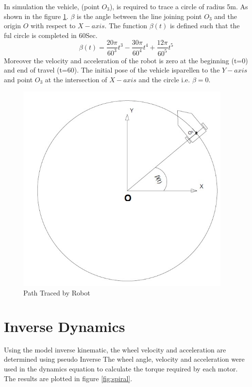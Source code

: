 In  simulation the vehicle, (point $O_3$), is required to trace a circle of radius 5m. As shown in the figure \ref{fig:CirTrace}. $ \beta$ is the angle between the line joining  point $O_3$ and the origin $O$ with respect to $X-axis$. The function $\beta(t)$ is defined such that the ful circle is completed in 60Sec. 
\begin{equation}
\label{path}
\beta(t)=\frac{20\pi}{60^3}t^3-\frac{30\pi}{60^4}t^4+\frac{12\pi}{60^5}t^5
\end{equation}
Moreover the velocity and acceleration of the robot is zero at the beginning (t=0) and end of travel (t=60). The initial pose of the vehicle isparellen to the $Y-axis$ and point $O_3$ at the intersection of $X-axis$ and the circle i.e. $\beta=0$.

\begin{figure}[H]
	\centering
		\includegraphics[height=300pt,keepaspectratio]{Chapter4/fig/pathCircle}
		\caption{Path Traced by Robot}
	\label{fig:CirTrace}
\end{figure}



\section{Inverse Dynamics}
Using the model inverse kinematic,  the wheel velocity and acceleration are determined using pseudo Inverse  %
The wheel angle, velocity and acceleration were used in the dynamics equation  to calculate the torque required by each motor. The results are plotted in figure \ref{fig:spiral}. 

